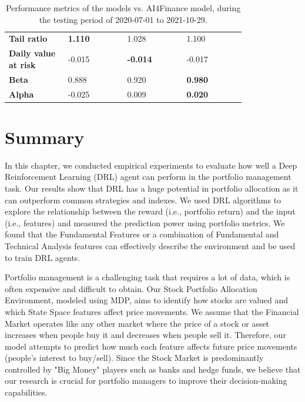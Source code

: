 \documentclass[../xlapes02]{subfiles}
\begin{document}
\begin{table}[h!]
{\begin{tabular}{*{4}{|m{0.20\linewidth}|}}
                \bfseries Tail ratio          & \color[HTML]{00F000} \bfseries 1.110 & 1.028                                 & 1.100 \\[0.5cm]
                \bfseries Daily value at risk & -0.015                               & \color[HTML]{00F000} \bfseries -0.014 & -0.017 \\[0.5cm]
                \bfseries Beta                & 0.888                                & 0.920                                 & \color[HTML]{00F000} \bfseries 0.980 \\[0.5cm]
                \bfseries Alpha               & -0.025                               & 0.009                                 & \color[HTML]{00F000} \bfseries 0.020 \\[0.5cm]
                \bottomrule
            \end{tabular}
        }
        \caption{Performance metrics of the models vs. AI4Finance model, during the testing period of 2020-07-01 to 2021-10-29.}
        \label{tab:stats2}
    \end{table}


    \section{Summary}\label{sec:summary}
    In this chapter, we conducted empirical experiments to evaluate how well a Deep Reinforcement Learning (DRL) agent can perform in the portfolio management task. Our results show that DRL has a huge potential in portfolio allocation as it can outperform common strategies and indexes. We used DRL algorithms to explore the relationship between the reward (i.e., portfolio return) and the input (i.e., features) and measured the prediction power using portfolio metrics. We found that the Fundamental Features or a combination of Fundamental and Technical Analysis features can effectively describe the environment and be used to train DRL agents.

    Portfolio management is a challenging task that requires a lot of data, which is often expensive and difficult to obtain. Our Stock Portfolio Allocation Environment, modeled using MDP, aims to identify how stocks are valued and which State Space features affect price movements. We assume that the Financial Market operates like any other market where the price of a stock or asset increases when people buy it and decreases when people sell it. Therefore, our model attempts to predict how much each feature affects future price movements (people's interest to buy/sell). Since the Stock Market is predominantly controlled by "Big Money" players such as banks and hedge funds, we believe that our research is crucial for portfolio managers to improve their decision-making capabilities.
\end{document}

